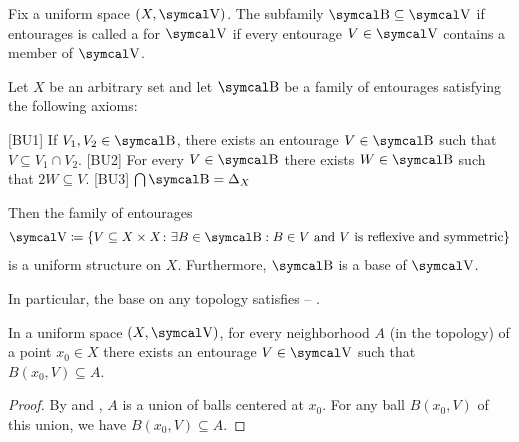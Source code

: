 \begin{definition}\label{def:uniform_space_base}
  Fix a uniform space \( (X, \CV) \). The subfamily \( \CB \subseteq \CV \) if entourages is called a  for \( \CV \) if every entourage \( V \in \CV \) contains a member of \( \CV \).
\end{definition}

\begin{definition}\label{thm:uniform_space_base_axioms}\cite[427, proposition 8.1.14]{Engelking1989}
  Let \( X \) be an arbitrary set and let \( \CB \) be a family of entourages satisfying the following axioms:
  \begin{description}
    [BU1] If \( V_1, V_2 \in \CB \), there exists an entourage \( V \in \CB \) such that \( V \subseteq V_1 \cap V_2 \).
    [BU2] For every \( V \in \CB \) there exists \( W \in \CB \) such that \( 2W \subseteq V \).
    [BU3] \( \bigcap \CB = \Delta_X \)
  \end{description}

  Then the family of entourages
  \begin{align}\label{thm:uniform_space_base_axioms/uniformity}
    \CV \coloneqq \left\{ V \subseteq X \times X \colon \exists B \in \CB: B \in V \Tand V \text{ is reflexive and symmetric} \right\}
  \end{align}
  is a uniform structure on \( X \). Furthermore, \( \CB \) is a base of \( \CV \).

  In particular, the base on any topology satisfies  -- .
\end{definition}

\begin{lemma}\label{thm:uniform_space_neighborhood_contains_ball}
  In a uniform space \( (X, \CV) \), for every neighborhood \( A \) (in the topology) of a point \( x_0 \in X \) there exists an entourage \( V \in \CV \) such that \( B(x_0, V) \subseteq A \).
\end{lemma}
\begin{proof}
  By  and , \( A \) is a union of balls centered at \( x_0 \). For any ball \( B(x_0, V) \) of this union, we have \( B(x_0, V) \subseteq A \).
\end{proof}

